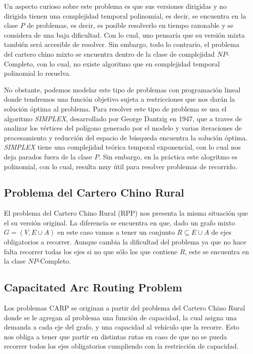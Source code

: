 \vspace{3mm}

Un aspecto curioso sobre este problema es que sus versiones dirigidas y no dirigida  tienen una complejidad temporal polinomial, es decir, se encuentra en la clase $P$ de problemas, es decir, es posible resolverlo en tiempo razonable y se considera de una baja dificultad. Con lo cual, uno pensaría que su versión mixta también será accesible de resolver. Sin embargo, todo lo contrario, el problema del cartero chino mixto se encuentra dentro de la clase de complejidad $NP$-Completo, con lo cual, no existe algoritmo que en complejidad temporal polinomial lo resuelva.

\vspace{3mm}

No obstante, podemos modelar este tipo de problemas con programación lineal donde tendremos una función objetivo sujeta a restricciones que nos darán la solución óptima al problema. Para resolver este tipo de problema se usa el algoritmo \textit{SIMPLEX}, desarrollado por George Dantzig en 1947, que a traves de analizar los vértices del polígono generado por el modelo y varias iteraciones de procesamiento y reducción del espacio de búsqueda encuentra la solución óptima. \textit{SIMPLEX} tiene una complejidad teórica temporal exponencial, con lo cual nos deja parados fuera de la clase $P$. Sin embargo, en la práctica este alogritmo es polinomial, con lo cual, resulta muy útil para resolver problemas de recorrido.

\subsection{Problema del Cartero Chino Rural}

El problema del Cartero Chino Rural (RPP) nos presenta la misma situación que el su versión original. La diferencia se encuentra en que, dado un grafo mixto $G = (V,E\cup A)$ en este caso vamos a tener un conjunto $R \subseteq E \cup A$ de ejes obligatorios a recorrer. Aunque cambia la dificultad del problema ya que no hace falta recorrer todas los ejes si no que sólo los que contiene $R$, este se encuentra en la clase $NP$-Completo.

\subsection{Capacitated Arc Routing Problem}

Los problemas CARP se originan a partir del problema del Cartero Chino Rural donde se le agregan al problema una función de capacidad, la cual asigna una demanda a cada eje del grafo, y una capacidad al vehículo que la recorre. Esto nos obliga a tener que partir en distintas rutas en caso de que no se pueda recorrer todos los ejes obligatorios cumpliendo con la restricción de capacidad.